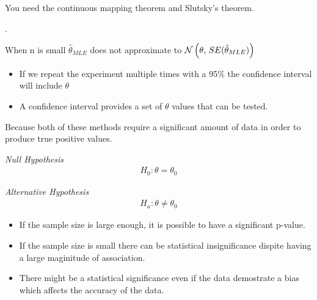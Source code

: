 \documentclass[12pt]{article}
\begin{document}
\begin{enumerate}
{You need the continuous mapping theorem and Slutsky's theorem.
}

.


When n is small $\hat\theta_{MLE}$ does not approximate to $\mathcal{N}\left(\theta,\,SE(\hat\theta_{MLE})\right)$ 


\begin{itemize}
    \item If we repeat the experiment multiple times with a 95\% the confidence interval will include $\theta$
    \item A confidence interval provides a set of $\theta$ values that can be tested. 
\end{itemize}


Because both of these methods require a significant amount of data in order to produce true positive values. 

\emph{Null Hypothesis}
\begin{align*}
    H_{0} : \theta = \theta_{0} 
\end{align*}

\emph{Alternative Hypothesis}
\begin{align*}
    H_{a} : \theta \neq \theta_{0}
\end{align*}


\begin{itemize}
    \item If the sample size is large enough, it is possible to have a significant p-value.
    \item If the sample size is small there can be statistical insignificance dispite having a large maginitude of association.
    \item There might be a statistical significance even if the data demostrate a bias which affects the accuracy of the data. 
\end{itemize}

\end{enumerate}
\end{document}
